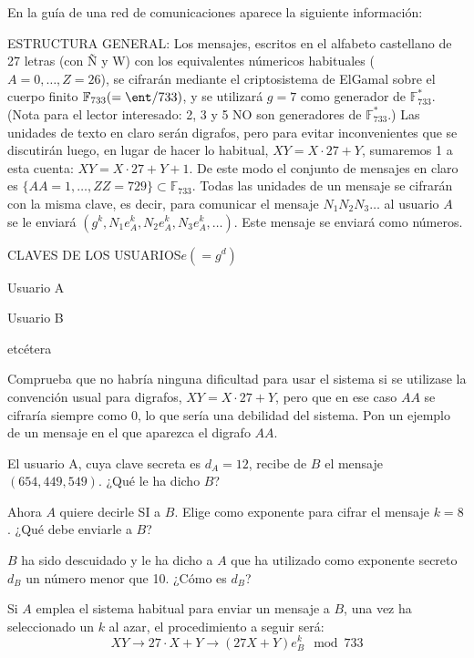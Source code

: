 \begin{problem}[2]
En la guía de una red de comunicaciones aparece la siguiente
información:

 ESTRUCTURA GENERAL: Los mensajes, escritos en el alfabeto
castellano de 27 letras (con Ñ y W) con los equivalentes númericos
habituales ($A=0,\dots,Z=26$), se cifrarán mediante el
criptosistema de ElGamal sobre el cuerpo finito
$\mathbb{F}_{733}(=\ent/733)$, y  se utilizará $g=7$ como generador de
$\mathbb{F}_{733}^*$. (Nota para el lector interesado: 2, 3 y 5 NO son
generadores  de $\mathbb{F}_{733}^*$.) Las unidades de texto en claro
serán digrafos, pero para evitar inconvenientes que se discutirán
luego, en lugar de hacer lo habitual, $XY=X\cdot27+Y$, sumaremos 1
a esta cuenta: $XY=X\cdot27+Y+1$. De este modo el conjunto de
mensajes en claro es $\{AA=1,\dots,ZZ=729\}\subset\mathbb{F}_{733}$. Todas
las unidades de un mensaje se cifrarán con la misma clave, es
decir, para comunicar el mensaje $N_1N_2N_3\dots$ al usuario $A$
se le enviará $(g^k,N_1e_A^k,N_2e_A^k,N_3e_A^k,\dots)$. Este
mensaje se enviará como números.


CLAVES DE LOS
USUARIOS\dotfill$e(=g^d)$\hphantom{AAAAAAAAAAAAAAAAAAAA}

Usuario A\hphantom{$(=g^d)$AAAAAAAAAAAAAAAAAA}

Usuario B\hphantom{$(=g^d)$AAAAAAAAAAAAAAAAAA}

etcétera

\ppart Comprueba que no habría ninguna dificultad para usar el
sistema si se utilizase la convención usual para digrafos,
$XY=X\cdot27+Y$, pero que en ese caso $AA$ se cifraría siempre
como 0, lo que sería una debilidad del sistema. Pon un ejemplo de
un mensaje en el que aparezca el digrafo $AA$.

\ppart El usuario A, cuya clave secreta es $d_A=12$, recibe de $B$ el
mensaje $(654,449,549)$. ¿Qué le ha dicho $B$?

\ppart Ahora $A$ quiere decirle SI a $B$. Elige como exponente para
cifrar el mensaje $k=8$. ¿Qué debe enviarle a $B$?

\ppart $B$ ha sido descuidado y le ha dicho a $A$ que ha utilizado
como exponente secreto $d_B$ un número menor que 10. ¿Cómo es
$d_B$?
\solution


\spart

Si $A$ emplea el sistema habitual para enviar un mensaje a $B$, una vez ha seleccionado un $k$ al azar, el procedimiento a seguir será:
\[XY \to 27\cdot X + Y \to (27X+Y)e_B^k \mod 733\]


\end{problem}

